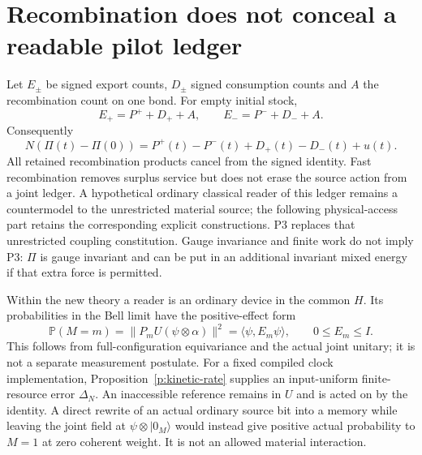 \documentclass[11pt,oneside,openany]{book}
\theoremstyle{definition}
\theoremstyle{remark}\newtheorem{remark}[theorem]{Remark}
\providecommand{\Prb}{\mathbb P}
\begin{document}
\section{Recombination does not conceal a readable pilot ledger}
Let $E_\pm$ be signed export counts, $D_\pm$ signed consumption counts and $A$ the recombination count on one bond. For empty initial stock,
\[
 E_+=P^++D_++A,\qquad E_-=P^-+D_-+A.
\]
Consequently
\begin{equation}
 N(\Pi(t)-\Pi(0))=P^+(t)-P^-(t)+D_+(t)-D_-(t)+u(t).
 \label{p:eq-ledger}
\end{equation}
All retained recombination products cancel from the signed identity. Fast recombination removes surplus service but does not erase the source action from a joint ledger. A hypothetical ordinary classical reader of this ledger remains a countermodel to the unrestricted material source; the following physical-access part retains the corresponding explicit constructions. P3 replaces that unrestricted coupling constitution. Gauge invariance and finite work do not imply P3: $\Pi$ is gauge invariant and can be put in an additional invariant mixed energy if that extra force is permitted.

Within the new theory a reader is an ordinary device in the common $H$. Its probabilities in the Bell limit have the positive-effect form
\begin{equation}
 \Prb(M=m)=\|P_mU(\psi\otimes\alpha)\|^2
       =\langle\psi,E_m\psi\rangle,\qquad 0\le E_m\le I.
 \label{p:eq-effect}
\end{equation}
This follows from full-configuration equivariance and the actual joint unitary; it is not a separate measurement postulate. For a fixed compiled clock implementation, Proposition~\ref{p:kinetic-rate} supplies an input-uniform finite-resource error $\Delta_N$. An inaccessible reference remains in $U$ and is acted on by the identity. A direct rewrite of an actual ordinary source bit into a memory while leaving the joint field at $\psi\otimes|0_M\rangle$ would instead give positive actual probability to $M=1$ at zero coherent weight. It is not an allowed material interaction.
\end{document}
